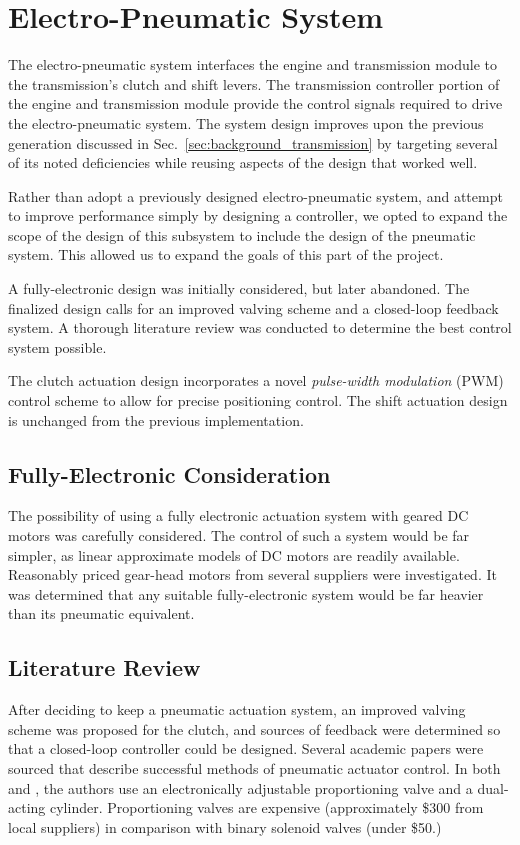 \section{Electro-Pneumatic System}

The electro-pneumatic system interfaces the engine and transmission module to the transmission's clutch and shift levers. The transmission controller portion of the engine and transmission module provide the control signals required to drive the electro-pneumatic system. The system design improves upon the previous generation discussed in Sec.\ \ref{sec:background_transmission} by targeting several of its noted deficiencies while reusing aspects of the design that worked well.

Rather than adopt a previously designed electro-pneumatic system, and attempt to improve performance simply by designing a controller, we opted to expand the scope of the design of this subsystem to include the design of the pneumatic system. This allowed us to expand the goals of this part of the project.

A fully-electronic design was initially considered, but later abandoned. The finalized design calls for an improved valving scheme and a closed-loop feedback system. A thorough literature review was conducted to determine the best control system possible. 

The clutch actuation design incorporates a novel \emph{pulse-width modulation} (PWM) control scheme to allow for precise positioning control. The shift actuation design is unchanged from the previous implementation. 

\subsection{Fully-Electronic Consideration}

The possibility of using a fully electronic actuation system with geared DC motors was carefully considered. The control of such a system would be far simpler, as linear approximate models of DC motors are readily available. Reasonably priced gear-head motors from several suppliers were investigated. It was determined that any suitable fully-electronic system would be far heavier than its pneumatic equivalent.

\subsection{Literature Review}

After deciding to keep a pneumatic actuation system, an improved valving scheme was proposed for the clutch, and sources of feedback were determined so that a closed-loop controller could be designed. Several academic papers were sourced that describe successful methods of pneumatic actuator control. In both \cite{pneumatic_actuator} and \cite{adaptive_pneumatic}, the authors use an electronically adjustable proportioning valve and a dual-acting cylinder. Proportioning valves are expensive (approximately \$300 from local suppliers) in comparison with binary solenoid valves (under \$50.)

